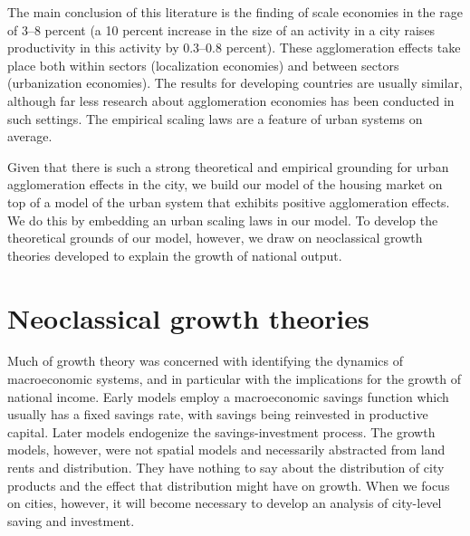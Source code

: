 The main conclusion of this literature is the finding of scale economies in the rage of 3--8 percent (a 10 percent increase in the size of an activity in a city raises productivity in this activity by 0.3--0.8 percent). These agglomeration effects take place both within sectors (localization economies) and between sectors (urbanization economies). The results for developing countries are usually similar, although far less research about agglomeration economies has been conducted in such settings. 
The empirical \glspl{scaling law} are a feature of urban systems on average. %



Given that there is such a strong theoretical and empirical grounding for urban agglomeration effects in the city, we build our model of the housing market on top of a model of the urban system that exhibits positive agglomeration effects. %
We do this by embedding an  urban \glspl{scaling law} in our model. To develop the theoretical grounds of our model, however, we draw on neoclassical growth theories developed to explain the growth of national output.

\section{Neoclassical growth theories}  \label{section-growth}
Much of growth theory was concerned with identifying the dynamics of macroeconomic systems,  and in particular with the implications for the growth of national income. Early models \cite{keynesGeneralTheoryEmployment1937, harrodEssayDynamicTheory1939, domarCapitalExpansionRate1946}  employ a macroeconomic savings function which usually has a fixed savings rate, with savings being reinvested in productive capital. Later models endogenize the savings-investment process. The growth models, however, were not spatial models and necessarily abstracted from land rents and distribution. They have nothing to say about the distribution of city products and the effect that distribution might have on growth. When we focus on cities, however, it will become necessary to develop an analysis of city-level saving and investment. 






